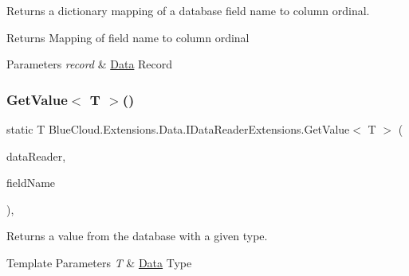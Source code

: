 Returns a dictionary mapping of a database field name to column ordinal. 

\begin{DoxyReturn}{Returns}
Mapping of field name to column ordinal
\end{DoxyReturn}

\begin{DoxyParams}{Parameters}
{\em record} & \mbox{\hyperlink{namespace_blue_cloud_1_1_extensions_1_1_data}{Data}} Record\\
\hline
\end{DoxyParams}
\mbox{\label{class_blue_cloud_1_1_extensions_1_1_data_1_1_i_data_reader_extensions_a9f0ec28408443dd8a53d3eebb81e4dda}} 
\subsubsection{\texorpdfstring{Get\+Value$<$ T $>$()}{GetValue< T >()}}
{\footnotesize\ttfamily static T Blue\+Cloud.\+Extensions.\+Data.\+I\+Data\+Reader\+Extensions.\+Get\+Value$<$ T $>$ (\begin{DoxyParamCaption}\item[{this I\+Data\+Reader}]{data\+Reader,  }\item[{string}]{field\+Name }\end{DoxyParamCaption})\hspace{0.3cm}{\ttfamily [inline]}, {\ttfamily [static]}}



Returns a value from the database with a given type. 


\begin{DoxyTemplParams}{Template Parameters}
{\em T} & \mbox{\hyperlink{namespace_blue_cloud_1_1_extensions_1_1_data}{Data}} Type\\
\hline
\end{DoxyTemplParams}

